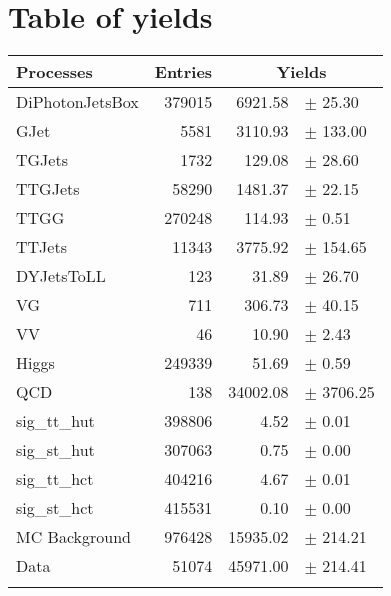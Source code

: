 \clearpage
\chapter{Table of yields}

{\renewcommand{\arraystretch}{1.0}
\begin{center}
\begin{tabular}{lrrl}
\hline\hline
Processes & Entries &\multicolumn{2}{c}{Yields}\\
\hline\hline
DiPhotonJetsBox  & 	          379015 & 	         6921.58 & $\pm$ 	      25.30\\
GJet		 & 	            5581 & 	         3110.93 & $\pm$ 	     133.00\\
TGJets		 & 	            1732 & 	          129.08 & $\pm$ 	      28.60\\
TTGJets		 & 	           58290 & 	         1481.37 & $\pm$ 	      22.15\\
TTGG		 & 	          270248 & 	          114.93 & $\pm$ 	       0.51\\
TTJets		 & 	           11343 & 	         3775.92 & $\pm$ 	     154.65\\
DYJetsToLL	 & 	             123 & 	           31.89 & $\pm$ 	      26.70\\
VG		 & 	             711 & 	          306.73 & $\pm$ 	      40.15\\
VV		 & 	              46 & 	           10.90 & $\pm$ 	       2.43\\
Higgs		 & 	          249339 & 	           51.69 & $\pm$ 	       0.59\\
QCD		 & 	             138 & 	        34002.08 & $\pm$ 	    3706.25\\
sig\_tt\_hut	 & 	          398806 & 	            4.52 & $\pm$ 	       0.01\\
sig\_st\_hut	 & 	          307063 & 	            0.75 & $\pm$ 	       0.00\\
sig\_tt\_hct	 & 	          404216 & 	            4.67 & $\pm$ 	       0.01\\
sig\_st\_hct	 & 	          415531 & 	            0.10 & $\pm$ 	       0.00\\
\hline
MC Background	 & 	          976428 & 	        15935.02 & $\pm$ 	     214.21\\
Data		 & 	           51074 & 	        45971.00 & $\pm$ 	     214.41\\
\hline\hline\\
\end{tabular}
\end{center}
}
\clearpage

